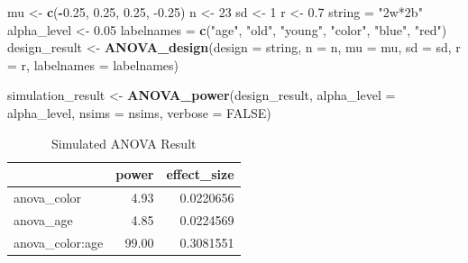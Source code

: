\documentclass[]{book}
\newenvironment{Shaded}{\begin{snugshade}}{\end{snugshade}}
\newcommand{\DataTypeTok}[1]{\textcolor[rgb]{0.13,0.29,0.53}{#1}}
\newcommand{\DecValTok}[1]{\textcolor[rgb]{0.00,0.00,0.81}{#1}}
\newcommand{\FloatTok}[1]{\textcolor[rgb]{0.00,0.00,0.81}{#1}}
\newcommand{\KeywordTok}[1]{\textcolor[rgb]{0.13,0.29,0.53}{\textbf{#1}}}
\newcommand{\NormalTok}[1]{#1}
\newcommand{\OperatorTok}[1]{\textcolor[rgb]{0.81,0.36,0.00}{\textbf{#1}}}
\newcommand{\OtherTok}[1]{\textcolor[rgb]{0.56,0.35,0.01}{#1}}
\newcommand{\StringTok}[1]{\textcolor[rgb]{0.31,0.60,0.02}{#1}}
\begin{document}
\begin{Shaded}
\begin{Highlighting}[]
\NormalTok{mu <-}\StringTok{ }\KeywordTok{c}\NormalTok{(}\OperatorTok{-}\FloatTok{0.25}\NormalTok{, }\FloatTok{0.25}\NormalTok{, }\FloatTok{0.25}\NormalTok{, }\FloatTok{-0.25}\NormalTok{)}
\NormalTok{n <-}\StringTok{ }\DecValTok{23}
\NormalTok{sd <-}\StringTok{ }\DecValTok{1}
\NormalTok{r <-}\StringTok{ }\FloatTok{0.7}
\NormalTok{string =}\StringTok{ "2w*2b"}
\NormalTok{alpha_level <-}\StringTok{ }\FloatTok{0.05}
\NormalTok{labelnames =}\StringTok{ }\KeywordTok{c}\NormalTok{(}\StringTok{"age"}\NormalTok{, }\StringTok{"old"}\NormalTok{, }\StringTok{"young"}\NormalTok{, }\StringTok{"color"}\NormalTok{, }\StringTok{"blue"}\NormalTok{, }\StringTok{"red"}\NormalTok{)}
\NormalTok{design_result <-}\StringTok{ }\KeywordTok{ANOVA_design}\NormalTok{(}\DataTypeTok{design =}\NormalTok{ string,}
                              \DataTypeTok{n =}\NormalTok{ n, }
                              \DataTypeTok{mu =}\NormalTok{ mu, }
                              \DataTypeTok{sd =}\NormalTok{ sd, }
                              \DataTypeTok{r =}\NormalTok{ r, }
                              \DataTypeTok{labelnames =}\NormalTok{ labelnames)}
\end{Highlighting}
\end{Shaded}

\begin{Shaded}
\begin{Highlighting}[]
\NormalTok{simulation_result <-}\StringTok{ }\KeywordTok{ANOVA_power}\NormalTok{(design_result, }
                                 \DataTypeTok{alpha_level =}\NormalTok{ alpha_level, }
                                 \DataTypeTok{nsims =}\NormalTok{ nsims,}
                                 \DataTypeTok{verbose =} \OtherTok{FALSE}\NormalTok{)}
\end{Highlighting}
\end{Shaded}

\begin{table}[t]

\caption{\label{tab:unnamed-chunk-139}Simulated ANOVA Result}
\centering
\begin{tabular}{l|r|r}
\hline
  & power & effect\_size\\
\hline
anova\_color & 4.93 & 0.0220656\\
\hline
anova\_age & 4.85 & 0.0224569\\
\hline
anova\_color:age & 99.00 & 0.3081551\\
\hline
\end{tabular}
\end{table}
\end{document}
